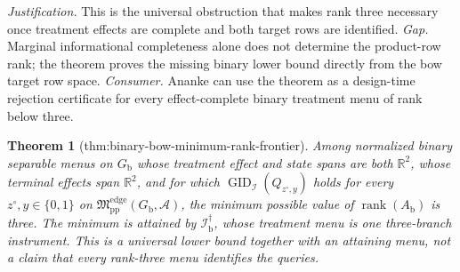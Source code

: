 \documentclass{article}
\newtheorem{theorem}{Theorem}
\begin{document}
\par\smallskip\noindent \textit{Justification.} This is the universal obstruction that makes rank three necessary once treatment effects are complete and both target rows are identified. \textit{Gap.} Marginal informational completeness alone does not determine the product-row rank; the theorem proves the missing binary lower bound directly from the bow target row space. \textit{Consumer.} Ananke can use the theorem as a design-time rejection certificate for every effect-complete binary treatment menu of rank below three.

\begin{theorem}[thm:binary-bow-minimum-rank-frontier]\label{thm:binary-bow-minimum-rank-frontier}
Among normalized binary separable menus on \(G_{\mathrm b}\) whose treatment
effect and state spans are both \(\mathbb R^2\), whose terminal effects span
\(\mathbb R^2\), and for which
\(\operatorname{GID}_{\mathcal I}(Q_{z^{\circ},y})\) holds for every
\(z^{\circ},y\in\{0,1\}\) on
\(\mathfrak M_{\mathrm{pp}}^{\mathrm{edge}}(G_{\mathrm b},\mathcal A)\),
the minimum possible value of \(\operatorname{rank}(A_{\mathrm b})\) is
three.  The minimum is attained by \(\mathcal I_{\mathrm b}^{\dagger}\),
whose treatment menu is one three-branch instrument.  This is a universal
lower bound together with an attaining menu, not a claim that every
rank-three menu identifies the queries.
\end{theorem}
\end{document}

